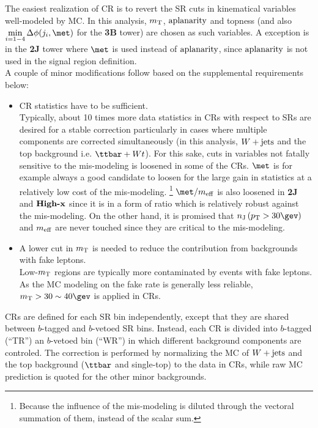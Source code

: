 The easiest realization of CR is to revert the SR cuts in kinematical variables well-modeled by MC. 
In this analysis, $m_{\mathrm{T}}$, $\mathrm{aplanarity}$ and topness (and also $\mindPhiFourJet$ for the \textbf{3B} tower) are chosen as such variables. 
A exception is in the \textbf{2J} tower where $\met$ is used instead of $\mathrm{aplanarity}$, since $\mathrm{aplanarity}$ is not used in the signal region definition. \\

\noindent A couple of minor modifications follow based on the supplemental requirements below:
\begin{itemize}
\item CR statistics have to be sufficient. \\
Typically, about 10 times more data statistics in CRs with respect to SRs are desired for a stable correction particularly in cases where multiple components are corrected simultaneously (in this analysis, $W+\mathrm{jets}$ and the top background i.e. $\ttbar+Wt$). 
For this sake, cuts in variables not fatally sensitive to the mis-modeling is loosened in some of the CRs.
$\met$ is for example always a good candidate to loosen for the large gain in statistics at a relatively low cost of the mis-modeling.
\footnote{Because the influence of the mis-modeling is diluted through the vectoral summation of them, instead of the scalar sum. }
$\metOverMeff$ is also loosened in \textbf{2J} and $\textbf{High-x}$ since it is in a form of ratio which is relatively robust against the mis-modeling.
On the other hand, it is promised that $\nJet$ and $m_{\mathrm{eff}}$ are never touched since they are critical to the mis-modeling. 
%
\item A lower cut in $m_{\mathrm{T}}$ is needed to reduce the contribution from backgrounds with fake leptons. \\
Low-$m_{\mathrm{T}}$ regions are typically more contaminated by events with fake leptons.
As the MC modeling on the fake rate is generally less reliable, $\mt > 30 \sim 40 \gev$ is applied in CRs. 
\end{itemize}

CRs are defined for each SR bin independently, except that they are shared between $b$-tagged and $b$-vetoed SR bins. Instead, each CR is divided into $b$-tagged (``TR'') an $b$-vetoed bin (``WR'') in which different background components are controled. The correction is performed by normalizing the MC of  $W+\mathrm{jets}$ and the top background ($\ttbar$ and single-top) to the data in CRs, while raw MC prediction is quoted for the other minor backgrounds. \\

